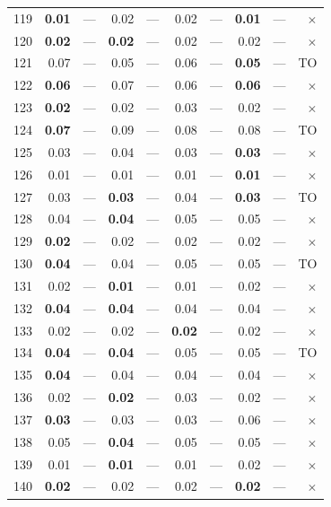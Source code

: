 \begin{longtable}{lr@{\hskip 4pt}l@{\hskip 12pt}r@{\hskip 4pt}l@{\hskip 12pt}r@{\hskip 4pt}l@{\hskip 12pt}r@{\hskip 4pt}l@{\hskip 12pt}r}
119 & \textbf{0.01} & --- & 0.02 & --- & 0.02 & --- & \textbf{0.01} & --- & $\times$ \\
120 & \textbf{0.02} & --- & \textbf{0.02} & --- & 0.02 & --- & 0.02 & --- & $\times$ \\
121 & 0.07 & --- & 0.05 & --- & 0.06 & --- & \textbf{0.05} & --- & TO \\
122 & \textbf{0.06} & --- & 0.07 & --- & 0.06 & --- & \textbf{0.06} & --- & $\times$ \\
123 & \textbf{0.02} & --- & 0.02 & --- & 0.03 & --- & 0.02 & --- & $\times$ \\
124 & \textbf{0.07} & --- & 0.09 & --- & 0.08 & --- & 0.08 & --- & TO \\
125 & 0.03 & --- & 0.04 & --- & 0.03 & --- & \textbf{0.03} & --- & $\times$ \\
126 & 0.01 & --- & 0.01 & --- & 0.01 & --- & \textbf{0.01} & --- & $\times$ \\
127 & 0.03 & --- & \textbf{0.03} & --- & 0.04 & --- & \textbf{0.03} & --- & TO \\
128 & 0.04 & --- & \textbf{0.04} & --- & 0.05 & --- & 0.05 & --- & $\times$ \\
129 & \textbf{0.02} & --- & 0.02 & --- & 0.02 & --- & 0.02 & --- & $\times$ \\
130 & \textbf{0.04} & --- & 0.04 & --- & 0.05 & --- & 0.05 & --- & TO \\
131 & 0.02 & --- & \textbf{0.01} & --- & 0.01 & --- & 0.02 & --- & $\times$ \\
132 & \textbf{0.04} & --- & \textbf{0.04} & --- & 0.04 & --- & 0.04 & --- & $\times$ \\
133 & 0.02 & --- & 0.02 & --- & \textbf{0.02} & --- & 0.02 & --- & $\times$ \\
134 & \textbf{0.04} & --- & \textbf{0.04} & --- & 0.05 & --- & 0.05 & --- & TO \\
135 & \textbf{0.04} & --- & 0.04 & --- & 0.04 & --- & 0.04 & --- & $\times$ \\
136 & 0.02 & --- & \textbf{0.02} & --- & 0.03 & --- & 0.02 & --- & $\times$ \\
137 & \textbf{0.03} & --- & 0.03 & --- & 0.03 & --- & 0.06 & --- & $\times$ \\
138 & 0.05 & --- & \textbf{0.04} & --- & 0.05 & --- & 0.05 & --- & $\times$ \\
139 & 0.01 & --- & \textbf{0.01} & --- & 0.01 & --- & 0.02 & --- & $\times$ \\
140 & \textbf{0.02} & --- & 0.02 & --- & 0.02 & --- & \textbf{0.02} & --- & $\times$ \\

\end{longtable}
